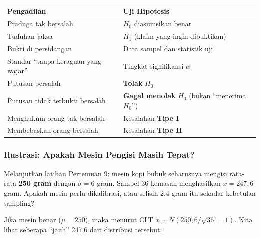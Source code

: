 \documentclass[
  indonesian,
  letterpaper,
]{book}
\newcounter{none} %
\begin{document}
{\def\LTcaptype{none} %
\begin{longtable}[]{@{}
  >{\raggedright\arraybackslash}p{}
  >{\raggedright\arraybackslash}p{}@{}}
\toprule\noalign{}
\begin{minipage}[b]{\linewidth}\raggedright
Pengadilan
\end{minipage} & \begin{minipage}[b]{\linewidth}\raggedright
Uji Hipotesis
\end{minipage} \\
\midrule\noalign{}
\endhead
\bottomrule\noalign{}
\endlastfoot
Praduga tak bersalah & \(H_0\) diasumsikan benar \\
Tuduhan jaksa & \(H_1\) (klaim yang ingin dibuktikan) \\
Bukti di persidangan & Data sampel dan statistik uji \\
Standar ``tanpa keraguan yang wajar'' & Tingkat signifikansi
\(\alpha\) \\
Putusan bersalah & \textbf{Tolak} \(H_0\) \\
Putusan tidak terbukti bersalah & \textbf{Gagal menolak} \(H_0\) (bukan
``menerima \(H_0\)'') \\
Menghukum orang tak bersalah & Kesalahan \textbf{Tipe I} \\
Membebaskan orang bersalah & Kesalahan \textbf{Tipe II} \\
\end{longtable}
}

\subsubsection{\texorpdfstring{\textbf{Ilustrasi: Apakah Mesin Pengisi
Masih
Tepat?}}{Ilustrasi: Apakah Mesin Pengisi Masih Tepat?}}\label{ilustrasi-apakah-mesin-pengisi-masih-tepat}

Melanjutkan latihan Pertemuan 9: mesin kopi bubuk seharusnya mengisi
rata-rata \textbf{250 gram} dengan \(\sigma = 6\) gram. Sampel 36
kemasan menghasilkan \(\bar{x} = 247{,}6\) gram. Apakah mesin perlu
dikalibrasi, atau selisih 2,4 gram itu sekadar kebetulan sampling?

Jika mesin benar (\(\mu = 250\)), maka menurut CLT
\(\bar{x} \sim N(250, 6/\sqrt{36} = 1)\). Kita lihat seberapa ``jauh''
247,6 dari distribusi tersebut:
\end{document}
